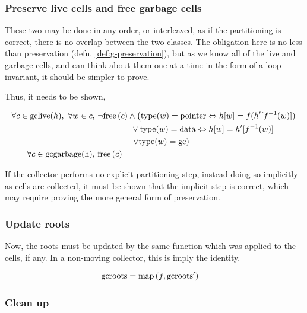 \subsubsection{Preserve live cells and free garbage cells}
\label{sec:gc-framework-obligations-collect}

These two may be done in any order, or interleaved, as if the
partitioning is correct, there is no overlap between the two
classes. The obligation here is no less than preservation
(defn. \ref{def:g-preservation}), but as we know all of the live and
garbage cells, and can think about them one at a time in the form of a
loop invariant, it should be simpler to prove.

Thus, it needs to be shown,

\begin{align*}
  \forall c \in \mathrm{gclive}(h),\ \forall w \in c,\ & \lnot\mathrm{free}\left(c\right) \land 
  \left(\mathrm{type}(w) = \mathrm{pointer} \Leftrightarrow h[w] =
    f(h'[f^{-1}(w)])\right.\\
  &\quad\quad\quad\quad \lor \mathrm{type}(w) = \mathrm{data}
  \Leftrightarrow h[w] = h'[f^{-1}(w)]\\
  &\quad\quad\quad\quad \left.\lor \mathrm{type}(w) =
    \mathrm{gc}\right)\\
  \forall c \in \mathrm{gcgarbage(h)},\ & \mathrm{free}\left(c\right)
\end{align*}

If the collector performs no explicit partitioning step, instead doing
so implicitly as cells are collected, it must be shown that the
implicit step is correct, which may require proving the more general
form of preservation.

\subsubsection{Update roots}
\label{sec:gc-framework-obligations-roots}

Now, the roots must be updated by the same function which was applied
to the cells, if any. In a non-moving collector, this is imply the
identity.

\begin{align*}
  \mathrm{gcroots} &= \mathrm{map}\left(f, \mathrm{gcroots'}\right)
\end{align*}

\subsubsection{Clean up}
\label{sec:gc-framework-obligations-clean}

